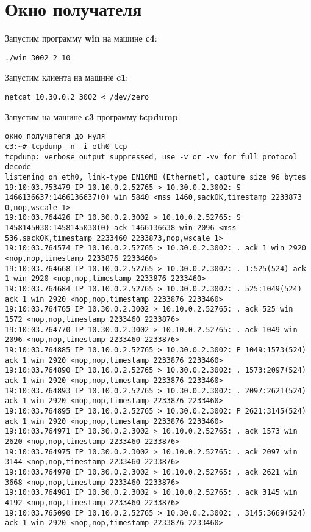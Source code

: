 \documentclass[a4paper,12pt]{article}
\begin{document}
\section{Окно получателя}

Запустим программу \textbf{win} на машине \textbf{c4}:
\begin{lstlisting}
./win 3002 2 10
\end{lstlisting}

Запустим клиента на машине \textbf{c1}:
\begin{lstlisting}
netcat 10.30.0.2 3002 < /dev/zero
\end{lstlisting}

Запустим на машине \textbf{c3} программу \textbf{tcpdump}:
\begin{lstlisting}
окно получателя до нуля
c3:~# tcpdump -n -i eth0 tcp
tcpdump: verbose output suppressed, use -v or -vv for full protocol decode
listening on eth0, link-type EN10MB (Ethernet), capture size 96 bytes
19:10:03.753479 IP 10.10.0.2.52765 > 10.30.0.2.3002: S 1466136637:1466136637(0) win 5840 <mss 1460,sackOK,timestamp 2233873 0,nop,wscale 1>
19:10:03.764426 IP 10.30.0.2.3002 > 10.10.0.2.52765: S 1458145030:1458145030(0) ack 1466136638 win 2096 <mss 536,sackOK,timestamp 2233460 2233873,nop,wscale 1>
19:10:03.764574 IP 10.10.0.2.52765 > 10.30.0.2.3002: . ack 1 win 2920 <nop,nop,timestamp 2233876 2233460>
19:10:03.764668 IP 10.10.0.2.52765 > 10.30.0.2.3002: . 1:525(524) ack 1 win 2920 <nop,nop,timestamp 2233876 2233460>
19:10:03.764684 IP 10.10.0.2.52765 > 10.30.0.2.3002: . 525:1049(524) ack 1 win 2920 <nop,nop,timestamp 2233876 2233460>
19:10:03.764765 IP 10.30.0.2.3002 > 10.10.0.2.52765: . ack 525 win 1572 <nop,nop,timestamp 2233460 2233876>
19:10:03.764770 IP 10.30.0.2.3002 > 10.10.0.2.52765: . ack 1049 win 2096 <nop,nop,timestamp 2233460 2233876>
19:10:03.764885 IP 10.10.0.2.52765 > 10.30.0.2.3002: P 1049:1573(524) ack 1 win 2920 <nop,nop,timestamp 2233876 2233460>
19:10:03.764890 IP 10.10.0.2.52765 > 10.30.0.2.3002: . 1573:2097(524) ack 1 win 2920 <nop,nop,timestamp 2233876 2233460>
19:10:03.764893 IP 10.10.0.2.52765 > 10.30.0.2.3002: . 2097:2621(524) ack 1 win 2920 <nop,nop,timestamp 2233876 2233460>
19:10:03.764895 IP 10.10.0.2.52765 > 10.30.0.2.3002: P 2621:3145(524) ack 1 win 2920 <nop,nop,timestamp 2233876 2233460>
19:10:03.764971 IP 10.30.0.2.3002 > 10.10.0.2.52765: . ack 1573 win 2620 <nop,nop,timestamp 2233460 2233876>
19:10:03.764975 IP 10.30.0.2.3002 > 10.10.0.2.52765: . ack 2097 win 3144 <nop,nop,timestamp 2233460 2233876>
19:10:03.764978 IP 10.30.0.2.3002 > 10.10.0.2.52765: . ack 2621 win 3668 <nop,nop,timestamp 2233460 2233876>
19:10:03.764981 IP 10.30.0.2.3002 > 10.10.0.2.52765: . ack 3145 win 4192 <nop,nop,timestamp 2233460 2233876>
19:10:03.765090 IP 10.10.0.2.52765 > 10.30.0.2.3002: . 3145:3669(524) ack 1 win 2920 <nop,nop,timestamp 2233876 2233460>


\end{lstlisting}
\end{document}
